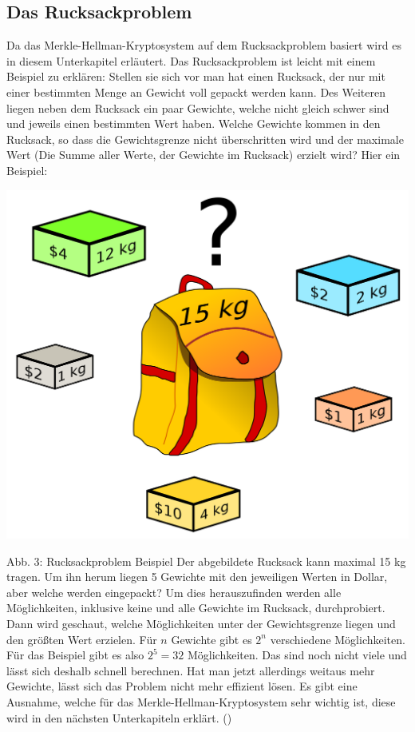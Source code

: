 \documentclass[a4paper,12pt,titlepage]{article}
\begin{document}
\subsection{Das Rucksackproblem}\label{rucksack}
Da das Merkle-Hellman-Kryptosystem auf dem Rucksackproblem basiert wird es in diesem Unterkapitel erläutert. \newline Das Rucksackproblem ist leicht mit einem Beispiel zu erklären: Stellen sie sich vor man hat einen Rucksack, der nur mit einer bestimmten Menge an Gewicht voll gepackt werden kann. Des Weiteren liegen neben dem Rucksack ein paar Gewichte, welche nicht gleich schwer sind und jeweils einen bestimmten Wert haben. Welche Gewichte kommen in den Rucksack, so dass die Gewichtsgrenze nicht überschritten wird und der maximale Wert (Die Summe aller Werte, der Gewichte im Rucksack) erzielt wird? \newline
Hier ein Beispiel:
\begin{center}
\includegraphics[scale=0.1,natwidth=2000,natheight=1733]{rucksackproblem.png} %
\end{center}
Abb. 3: Rucksackproblem Beispiel
Der abgebildete Rucksack kann maximal 15 kg tragen. Um ihn herum liegen 5 Gewichte mit den jeweiligen Werten in Dollar, aber welche werden eingepackt? Um dies herauszufinden werden alle Möglichkeiten, inklusive keine und alle Gewichte im Rucksack, durchprobiert. Dann wird geschaut, welche Möglichkeiten unter der Gewichtsgrenze liegen und den größten Wert erzielen. Für $n$ Gewichte gibt es $2^{n}$ verschiedene Möglichkeiten. Für das Beispiel gibt es also $2^{5} = 32$ Möglichkeiten. Das sind noch nicht viele und lässt sich deshalb schnell berechnen. Hat man jetzt allerdings weitaus mehr Gewichte, lässt sich das Problem nicht mehr effizient lösen. Es gibt eine Ausnahme, welche für das Merkle-Hellman-Kryptosystem sehr wichtig ist, diese wird in den nächsten Unterkapiteln erklärt. (\cite{knapsack})
\end{document}
